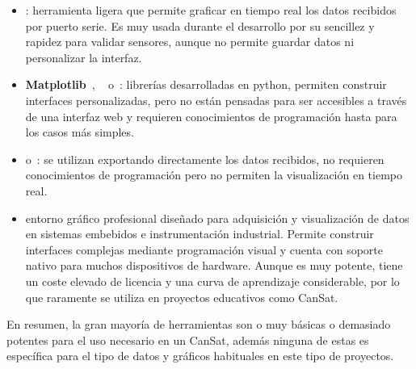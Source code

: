 \begin{itemize}
    \item \textbf{\cite{serialplot}}: herramienta ligera que permite graficar en tiempo real los datos recibidos por puerto serie.
    Es muy usada durante el desarrollo por su sencillez y rapidez para validar sensores, aunque no permite guardar datos ni personalizar la interfaz.
    \item \textbf{Matplotlib}~\cite{matplotlib}, ~\textbf{\cite{pyqtgraph}} o~\textbf{\cite{tkinter}}: librerías desarrolladas en python, permiten construir interfaces personalizadas, pero no están pensadas para ser accesibles a través de una interfaz web y requieren conocimientos de programación hasta para los casos más simples.
    \item \textbf{\cite{excel}} o~\textbf{\cite{googlesheets}}: se utilizan exportando directamente los datos recibidos, no requieren conocimientos de programación pero no permiten la visualización en tiempo real.
    \item \textbf{\cite{labview}} entorno gráfico profesional diseñado para adquisición y visualización de datos en sistemas embebidos e instrumentación industrial.
    Permite construir interfaces complejas mediante programación visual y cuenta con soporte nativo para muchos dispositivos de hardware.
    Aunque es muy potente, tiene un coste elevado de licencia y una curva de aprendizaje considerable, por lo que raramente se utiliza en proyectos educativos como CanSat.
\end{itemize}

En resumen, la gran mayoría de herramientas son o muy básicas o demasiado potentes para el uso necesario en un CanSat, además ninguna de estas es específica para el tipo de datos y gráficos habituales en este tipo de proyectos.
